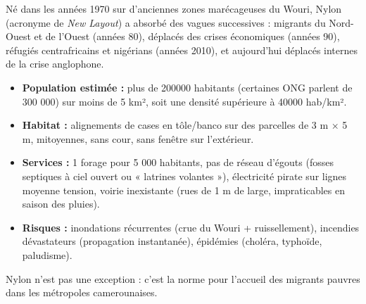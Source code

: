\documentclass[11pt]{article}
\begin{document}
\begin{exemplebox}
Né dans les années 1970 sur d'anciennes zones marécageuses du Wouri, Nylon (acronyme de \emph{New Layout}) a absorbé des vagues successives : migrants du Nord-Ouest et de l'Ouest (années 80), déplacés des crises économiques (années 90), réfugiés centrafricains et nigérians (années 2010), et aujourd'hui déplacés internes de la crise anglophone.
\begin{itemize}
    \item \textbf{Population estimée :} plus de \num{200 000} habitants (certaines ONG parlent de 300 000) sur moins de 5 km², soit une densité supérieure à \num{40 000} hab/km².
    \item \textbf{Habitat :} alignements de cases en tôle/banco sur des parcelles de 3 m × 5 m, mitoyennes, sans cour, sans fenêtre sur l'extérieur.
    \item \textbf{Services :} 1 forage pour 5 000 habitants, pas de réseau d'égouts (fosses septiques à ciel ouvert ou « latrines volantes »), électricité pirate sur lignes moyenne tension, voirie inexistante (rues de 1 m de large, impraticables en saison des pluies).
    \item \textbf{Risques :} inondations récurrentes (crue du Wouri + ruissellement), incendies dévastateurs (propagation instantanée), épidémies (choléra, typhoïde, paludisme).
\end{itemize}
Nylon n'est pas une exception : c'est la norme pour l'accueil des migrants pauvres dans les métropoles camerounaises.
\end{exemplebox}
\end{document}
